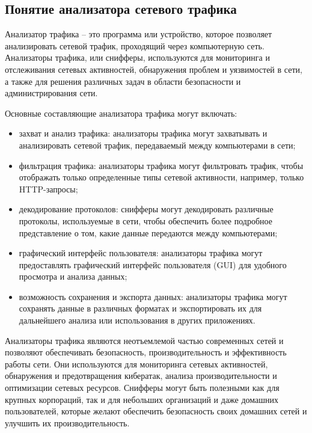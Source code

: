 \subsection{Понятие анализатора сетевого трафика}

Анализатор трафика -- это программа или устройство, которое позволяет
анализировать сетевой трафик, проходящий через компьютерную сеть.
Анализаторы трафика, или снифферы, используются для мониторинга и
отслеживания сетевых активностей, обнаружения проблем и уязвимостей в сети,
а также для решения различных задач в области безопасности и
администрирования сети.


Основные составляющие анализатора трафика могут включать:
\begin{itemize}
    \item захват и анализ трафика: анализаторы трафика могут захватывать и
    анализировать сетевой трафик, передаваемый между компьютерами в сети;
    \item фильтрация трафика: анализаторы трафика могут фильтровать трафик,
    чтобы отображать только определенные типы сетевой активности, например,
    только HTTP-запросы;
    \item декодирование протоколов: снифферы могут декодировать различные
    протоколы, используемые в сети, чтобы обеспечить более подробное
    представление о том, какие данные передаются между компьютерами;
    \item графический интерфейс пользователя: анализаторы трафика могут
    предоставлять графический интерфейс пользователя (GUI) для удобного
    просмотра и анализа данных;
    \item возможность сохранения и экспорта данных: анализаторы трафика могут
    сохранять данные в различных форматах и экспортировать их для дальнейшего
    анализа или использования в других приложениях.
\end{itemize}

Анализаторы трафика являются неотъемлемой частью современных сетей
и позволяют обеспечивать безопасность, производительность и эффективность
работы сети. Они используются для мониторинга сетевых активностей,
обнаружения и предотвращения кибератак, анализа производительности и
оптимизации сетевых ресурсов. Снифферы могут быть полезными как для
крупных корпораций, так и для небольших организаций и даже домашних
пользователей, которые желают обеспечить безопасность своих домашних сетей
и улучшить их производительность.


